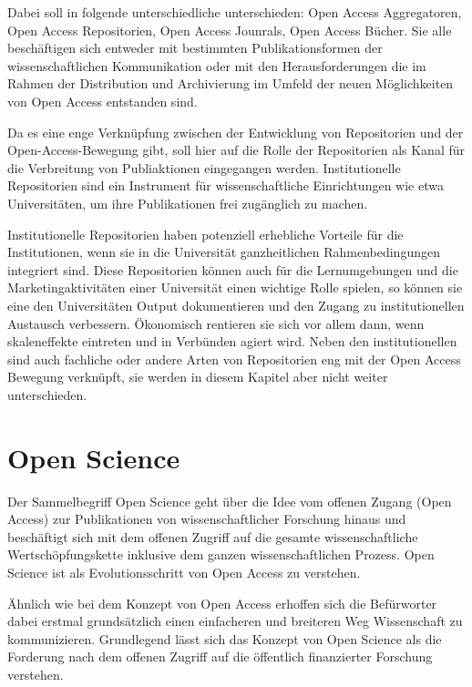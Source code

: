 Dabei soll in folgende unterschiedliche unterschieden: Open Access Aggregatoren, Open Access Repositorien, Open Access Jounrals, Open Access Bücher. Sie alle beschäftigen sich entweder mit bestimmten Publikationsformen der wissenschaftlichen Kommunikation oder mit den Herausforderungen die im Rahmen der Distribution und Archivierung im Umfeld der neuen Möglichkeiten von Open Access entstanden sind. 

Da es eine enge Verknüpfung zwischen der Entwicklung von Repositorien und der Open-Access-Bewegung gibt\cite{offhaus_2012_institutionelle_repos}, soll hier auf die Rolle der Repositorien als Kanal für die Verbreitung von Publiaktionen eingegangen werden. Institutionelle Repositorien sind ein Instrument für wissenschaftliche Einrichtungen wie etwa Universitäten, um ihre Publikationen frei zugänglich zu machen\cite{dobratz_2007_open}.

Institutionelle Repositorien haben potenziell erhebliche Vorteile für die Institutionen, wenn sie in die Universität ganzheitlichen Rahmenbedingungen integriert sind\cite{steele_2006}. Diese Repositorien können auch für die Lernumgebungen und die Marketingaktivitäten einer Universität einen wichtige Rolle spielen, so können sie eine den Universitäten Output dokumentieren und den Zugang zu institutionellen Austausch verbessern\cite{steele_2006}. Ökonomisch rentieren sie sich vor allem dann, wenn skaleneffekte eintreten und in Verbünden agiert wird.\cite{blythe_2005value} Neben den institutionellen sind auch fachliche oder andere Arten von Repositorien eng mit der Open Access Bewegung verknüpft, sie werden in diesem Kapitel aber nicht weiter unterschieden.

\section{Open Science}
Der Sammelbegriff Open Science geht über die Idee vom offenen Zugang (Open Access) zur Publikationen von wissenschaftlicher Forschung hinaus und beschäftigt sich mit dem offenen Zugriff auf die gesamte wissenschaftliche Wertschöpfungskette inklusive dem ganzen wissenschaftlichen Prozess. Open Science ist als Evolutionsschritt von Open Access zu verstehen. 

Ähnlich wie bei dem Konzept von Open Access erhoffen sich die Befürworter dabei erstmal grundsätzlich einen einfacheren und breiteren Weg Wissenschaft zu kommunizieren. Grundlegend lässt sich das Konzept von Open Science als die Forderung nach dem offenen Zugriff auf die öffentlich finanzierter Forschung verstehen. 

